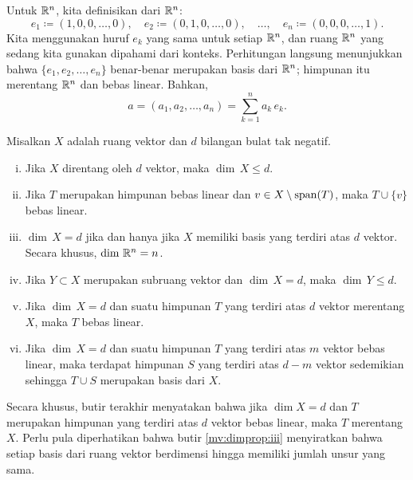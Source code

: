 Untuk ${\mathbb{R}}^n$,
kita definisikan
\emph{} dari ${\mathbb{R}}^n$:
\begin{equation*}
e_1 \coloneqq (1,0,0,\ldots,0) , \quad
e_2 \coloneqq (0,1,0,\ldots,0) , \quad \ldots, \quad
e_n \coloneqq (0,0,0,\ldots,1) .
\end{equation*}
Kita menggunakan huruf $e_k$ yang sama untuk setiap ${\mathbb{R}}^n$, dan
ruang ${\mathbb{R}}^n$ yang sedang kita gunakan dipahami dari konteks.
Perhitungan langsung menunjukkan bahwa $\{ e_1, e_2, \ldots, e_n \}$ benar-benar
merupakan basis dari ${\mathbb{R}}^n$; himpunan itu merentang ${\mathbb{R}}^n$ dan
bebas linear.  Bahkan,
\begin{equation*}
a = (a_1,a_2,\ldots,a_n) = \sum_{k=1}^n a_k \, e_k .
\end{equation*}

\begin{prop} \label{mv:dimprop}
\pagebreak[2]
Misalkan $X$ adalah ruang vektor dan $d$ bilangan bulat tak negatif.
\begin{enumerate}[(i)]
\item \label{mv:dimprop:i}
Jika $X$ direntang oleh $d$ vektor, maka $\dim \, X \leq d$.
\item \label{mv:dimprop:ii}
Jika $T$ merupakan himpunan bebas linear dan
$v \in X \setminus \operatorname{span} (T)$, maka
$T \cup \{ v \}$ bebas linear.
\item \label{mv:dimprop:iii}
$\dim \, X = d$ jika dan hanya jika $X$ memiliki basis yang terdiri atas $d$
vektor.
Secara khusus, $\dim \, {\mathbb{R}}^n = n$.
\item \label{mv:dimprop:iv}
Jika $Y \subset X$ merupakan subruang vektor dan $\dim \, X = d$,
maka $\dim \, Y \leq d$.
\item \label{mv:dimprop:v}
Jika $\dim \, X = d$ dan suatu himpunan $T$ yang terdiri atas $d$ vektor merentang $X$,
maka $T$ bebas linear.
\item \label{mv:dimprop:vi}
Jika $\dim \, X = d$ dan suatu himpunan $T$ yang terdiri atas $m$ vektor
bebas linear, maka terdapat himpunan $S$ yang terdiri atas $d-m$
vektor sedemikian sehingga $T \cup S$ merupakan basis dari $X$.
\end{enumerate}
\end{prop}

Secara khusus, butir terakhir menyatakan bahwa jika $\dim X = d$ dan $T$ merupakan
himpunan yang terdiri atas $d$ vektor bebas linear, maka $T$ merentang $X$.
Perlu pula diperhatikan bahwa butir \ref{mv:dimprop:iii} menyiratkan bahwa setiap
basis dari ruang vektor berdimensi hingga memiliki jumlah unsur yang sama.


